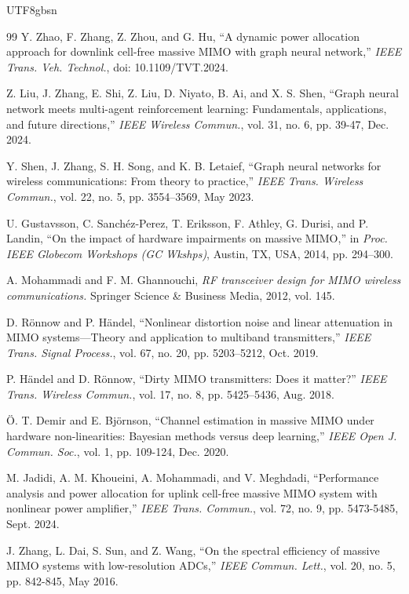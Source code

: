\documentclass[lettersize,journal]{IEEEtran}
\begin{document}
\begin{CJK}{UTF8}{gbsn}
\begin{thebibliography}{99}
Y. Zhao, F. Zhang, Z. Zhou, and G. Hu, “A dynamic power allocation approach for downlink cell-free massive MIMO with graph neural network,” \emph{IEEE Trans. Veh. Technol.}, doi: 10.1109/TVT.2024.

Z. Liu, J. Zhang, E. Shi, Z. Liu, D. Niyato, B. Ai, and X. S. Shen, “Graph neural network meets multi-agent reinforcement learning: Fundamentals, applications, and future directions,” \emph{IEEE Wireless Commun.}, vol. 31, no. 6, pp. 39-47, Dec. 2024.

Y. Shen, J. Zhang, S. H. Song, and K. B. Letaief, “Graph neural networks for wireless communications: From theory to practice,” \emph{IEEE Trans.
Wireless Commun.}, vol. 22, no. 5, pp. 3554–3569, May 2023.

U. Gustavsson, C. Sanchéz-Perez, T. Eriksson, F. Athley, G. Durisi, and P. Landin, “On the impact of hardware impairments on massive MIMO,” in \emph{Proc. IEEE Globecom Workshops (GC Wkshps)}, Austin, TX, USA, 2014, pp. 294–300.

A. Mohammadi and F. M. Ghannouchi, \textit{RF transceiver design for MIMO wireless communications.} Springer Science \& Business Media, 2012, vol. 145.

D. Rönnow and P. Händel, “Nonlinear distortion noise and linear attenuation in MIMO systems—Theory and application to multiband transmitters,” \emph{IEEE Trans. Signal Process.}, vol. 67, no. 20, pp. 5203–5212, Oct. 2019.

P. Händel and D. Rönnow, “Dirty MIMO transmitters: Does it matter?” \emph{IEEE Trans. Wireless Commun.}, vol. 17, no. 8, pp. 5425–5436, Aug. 2018.

Ö. T. Demir and E. Björnson, “Channel estimation in massive MIMO under hardware non-linearities: Bayesian methods versus deep learning,” \emph{IEEE Open J. Commun. Soc.}, vol. 1, pp. 109-124, Dec. 2020.

M. Jadidi, A. M. Khoueini, A. Mohammadi, and V. Meghdadi, “Performance analysis and power allocation for uplink cell-free massive MIMO system with nonlinear power amplifier,” \emph{IEEE Trans. Commun.}, vol. 72, no. 9, pp. 5473-5485, Sept. 2024.

J. Zhang, L. Dai, S. Sun, and Z. Wang, “On the spectral efficiency of massive MIMO systems with low-resolution ADCs,” \textit{IEEE Commun. Lett.}, vol. 20, no. 5, pp. 842-845, May 2016.


\end{thebibliography}
\end{CJK}
\end{document}
